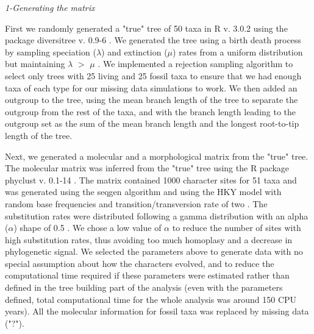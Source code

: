 \documentclass[12pt,letterpaper]{article}
\renewcommand{\subsection}[1]{%
\bigskip
\begin{center}
\begin{large}
\normalfont\itshape #1
\end{large}
\end{center}}
\begin{document}

\subsection{1-Generating the matrix} %
First we randomly generated a "true" tree of 50 taxa in R v. 3.0.2 \citep{R302} using the package diversitree v. 0.9-6 \citep{fitzjohndiversitree2012}. We generated the tree using a birth death process by sampling speciation ($\lambda$) and extinction ($\mu$) rates from a uniform distribution but maintaining $\lambda$ $>$ $\mu$ \citep{paradistime-dependent2011}. We implemented a rejection sampling algorithm to select only trees with 25 living and 25 fossil taxa to ensure that we had enough taxa of each type for our missing data simulations to work. We then added an outgroup to the tree, using the mean branch length of the tree to separate the outgroup from the rest of the taxa, and with the branch length leading to the outgroup set as the sum of the mean branch length and the longest root-to-tip length of the tree.

Next, we generated a molecular and a morphological matrix from the "true" tree. The molecular matrix was inferred from the "true" tree using the R package phyclust v. 0.1-14 \citep{chen2011}. The matrix contained 1000 character sites for 51 taxa and was generated using the seqgen algorithm \citep{ranbaut1997seqgen} and using the HKY model \citep{HKY85} with random base frequencies and transition/transversion rate of two \citep{douadycomparison2003}. The substitution rates were distributed following a gamma distribution with an alpha ($\alpha$) shape of 0.5 \citep{yangamong-site1996}. We chose a low value of $\alpha$ to reduce the number of sites with high substitution rates, thus avoiding too much homoplasy and a decrease in phylogenetic signal. We selected the parameters above to generate data with no special assumption about how the characters evolved, and to reduce the computational time required if these parameters were estimated rather than defined in the tree building part of the analysis (even with the parameters defined, total computational time for the whole analysis was around 150 CPU years). All the molecular information for fossil taxa was replaced by missing data ("?").
\end{document}
